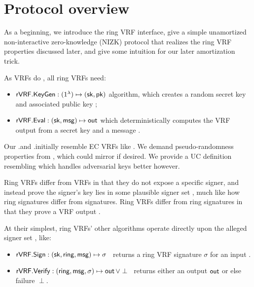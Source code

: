 \section{Protocol overview}
\label{sec:overview}

As a beginning, we introduce the ring VRF interface, give a simple
unamortized non-interactive zero-knowledge (NIZK) protocol that
realizes the ring VRF properties discussed later,
and give some intuition for our later amortization trick.

As VRFs do \cite{vrf_micali}, all ring VRFs need: 
\begin{itemize}
\item ${\mathsf{rVRF}}.{\mathsf{KeyGen}} : (1^{\lambda}) \mapsto (\mathsf{sk}, \mathsf{pk})$ algorithm,
 which creates a random secret key \sk and associated public key \pk;

\item ${\mathsf{rVRF}}.{\mathsf{Eval}} : (\mathsf{sk},\mathsf{msg}) \mapsto {\ensuremath{\mathsf{out}}}$ which deterministically computes the VRF output \Out from a secret key \sk and a message \msg.
\end{itemize}
%
Our \rVRF.\KeyGen and \rVRF.\Eval initially resemble EC VRFs like \cite{nsec5,VXEd25519,draft-irtf-cfrg-vrf-10}.
We demand pseudo-randomness properties from \Eval, which could mirror
\cite{vrf_micali} if desired.  We provide a UC definition resembling
\cite{praos,ucvrf} which handles adversarial keys better however.

Ring VRFs differ from VRFs in that they do not expose a specific signer,
and instead prove the signer's key lies in some plausible signer set \ring,
 much like how ring signatures differ from signatures.
Ring VRFs differ from ring signatures in that they prove a VRF output \Out.

At their simplest,
ring VRFs' other algorithms operate directly upon
 the alleged signer set \ring, like:
\begin{itemize}
\item ${\mathsf{rVRF}}.{\mathsf{Sign}} : (\mathsf{sk},\mathsf{ring},\mathsf{msg}) \mapsto \sigma$ \,
    returns a ring VRF signature $\sigma$ for an input \msg.
\item ${\mathsf{rVRF}}.{\mathsf{Verify}} : (\mathsf{ring},\mathsf{msg},\sigma) \mapsto {\ensuremath{\mathsf{out}}} \, \lor \perp$ \,
    returns either an output ${\mathsf{out}}$ or else failure $\perp$.
\end{itemize}

